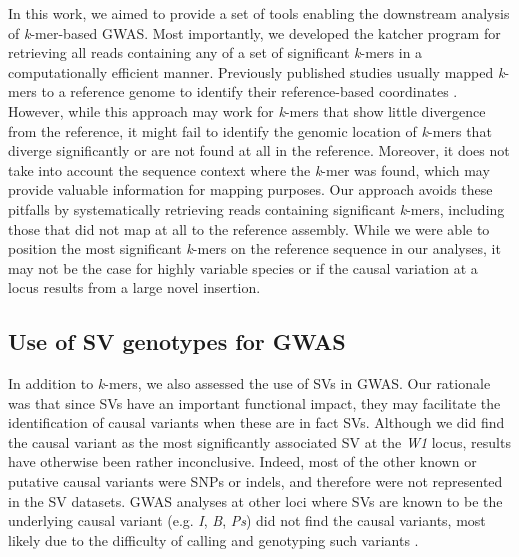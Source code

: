 In this work, we aimed to provide a set of tools enabling the downstream
analysis of \emph{k}-mer-based GWAS. Most importantly, we developed the
katcher program for retrieving all reads containing
any of a set of significant \emph{k}-mers in a computationally efficient manner. Previously published studies usually
mapped \emph{k}-mers to a reference genome to identify their reference-based
coordinates \citep[e.g.][]{voichek2020, he2021, rahman2018, tripodi2021}.
However, while this approach may work for \emph{k}-mers that show little
divergence from the reference, it might fail to identify the genomic location
of \emph{k}-mers that diverge significantly or are not found at all in the
reference. Moreover, it does not take into account the sequence context where
the \emph{k}-mer was found, which may provide valuable information for mapping
purposes. Our approach avoids these pitfalls by systematically retrieving reads
containing significant \emph{k}-mers, including those that did not map at all
to the reference assembly. While we were able to position the most significant
\emph{k}-mers on the reference sequence in our analyses, it may not be the case
for highly variable species or if the causal variation at a locus results from
a large novel insertion.

\subsection{Use of SV genotypes for GWAS}
\label{use-of-svs-for-gwas}

In addition to \emph{k}-mers, we also assessed the use of SVs in GWAS. Our
rationale was that since SVs have an important functional impact, they may
facilitate the identification of causal variants when these are in fact SVs.
Although we did find the causal variant as the most significantly associated SV
at the \emph{W1} locus, results have otherwise been rather inconclusive.
Indeed, most of the other known or putative causal variants were SNPs or
indels, and therefore were not represented in the SV datasets. GWAS analyses at
other loci where SVs are known to be the underlying causal variant (e.g.
\emph{I}, \emph{B}, \emph{Ps}) did not find the causal variants, most likely
due to the difficulty of calling and genotyping such variants
\citep{kosugi2019, lemay2022}.

